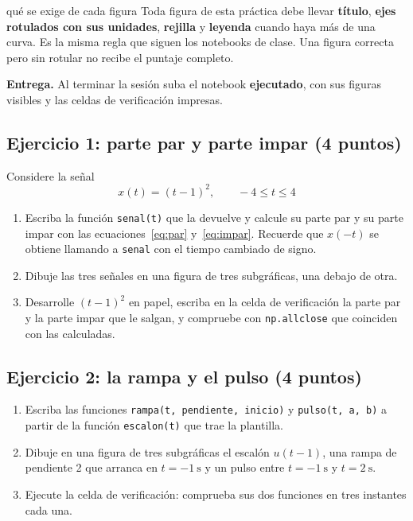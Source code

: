 \documentclass[11pt,a4paper]{article}
\newcommand{\py}[1]{\texttt{#1}}
\newcommand{\puntos}[1]{\normalfont\normalsize\textmd{(#1 puntos)}}
\begin{document}
\begin{notatec}{qué se exige de cada figura}
Toda figura de esta práctica debe llevar \textbf{título}, \textbf{ejes rotulados con sus
unidades}, \textbf{rejilla} y \textbf{leyenda} cuando haya más de una curva. Es la misma
regla que siguen los notebooks de clase. Una figura correcta pero sin rotular no recibe
el puntaje completo.
\end{notatec}

\noindent\textbf{Entrega.} Al terminar la sesión suba el notebook \textbf{ejecutado}, con
sus figuras visibles y las celdas de verificación impresas.

\subsection{Ejercicio 1: parte par y parte impar \puntos{4}}
Considere la señal
\begin{equation}
  x(t) = (t-1)^2, \qquad -4 \le t \le 4
\end{equation}

\begin{enumerate}[label=\textbf{\alph*)}, leftmargin=*, labelsep=0.6em]
    \item Escriba la función \py{senal(t)} que la devuelve y calcule su parte par y su
          parte impar con las ecuaciones~\eqref{eq:par} y~\eqref{eq:impar}. Recuerde que
          $x(-t)$ se obtiene llamando a \py{senal} con el tiempo cambiado de signo.
    \item Dibuje las tres señales en una figura de tres subgráficas, una debajo de otra.
    \item Desarrolle $(t-1)^2$ en papel, escriba en la celda de verificación la parte par
          y la parte impar que le salgan, y compruebe con \py{np.allclose} que coinciden
          con las calculadas.
\end{enumerate}

\subsection{Ejercicio 2: la rampa y el pulso \puntos{4}}
\begin{enumerate}[label=\textbf{\alph*)}, leftmargin=*, labelsep=0.6em]
    \item Escriba las funciones \py{rampa(t, pendiente, inicio)} y \py{pulso(t, a, b)}
          a partir de la función \py{escalon(t)} que trae la plantilla.
    \item Dibuje en una figura de tres subgráficas el escalón $u(t-1)$, una rampa de
          pendiente \num{2} que arranca en $t = \qty{-1}{\second}$ y un pulso entre
          $t = \qty{-1}{\second}$ y $t = \qty{2}{\second}$.
    \item Ejecute la celda de verificación: comprueba sus dos funciones en tres
          instantes cada una.
\end{enumerate}
\end{document}

